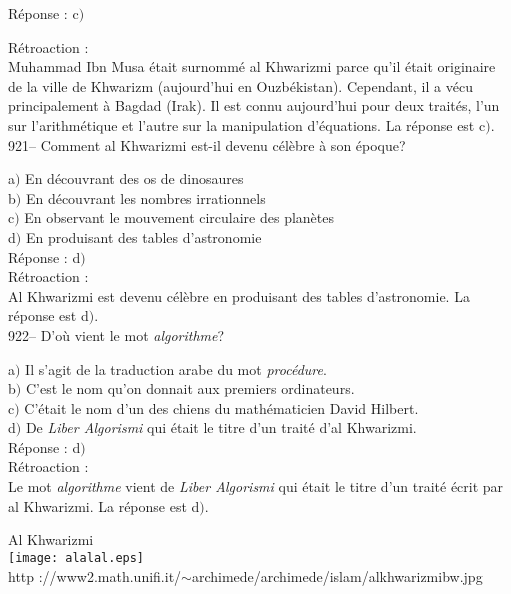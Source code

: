 ﻿\documentclass[letterpaper, 12pt]{article}
\begin{document}
R\'eponse : c$)$\

R\'etroaction : \\
Muhammad Ibn Musa \'etait surnomm\'e al Khwarizmi parce qu'il
\'etait originaire de la ville de Khwarizm (aujourd'hui en
Ouzb\'ekistan). Cependant, il a v\'ecu principalement \`a Bagdad
(Irak). Il est connu aujourd'hui pour deux trait\'es,
l'un sur l'arithm\'etique et l'autre sur la manipulation d'\'equations. La
r\'eponse est c$)$.\\

921-- Comment al Khwarizmi est-il devenu c\'el\`ebre \`a son
\'epoque?

a$)$ En d\'ecouvrant des os de dinosaures \\
b$)$ En d\'ecouvrant les nombres irrationnels \\
c$)$ En observant le mouvement circulaire des plan\`etes \\
d$)$ En produisant des tables d'astronomie \\

R\'eponse : d$)$\\

R\'etroaction : \\
Al Khwarizmi est devenu c\'el\`ebre en produisant des tables d'astronomie.
La r\'eponse est d$)$.\\

922-- D'o\`u vient le mot {\sl algorithme}?

a$)$ Il s'agit de la traduction arabe du mot {\sl proc\'edure}. \\
b$)$ C'est le nom qu'on donnait aux premiers ordinateurs. \\
c$)$ C'\'etait le nom d'un des chiens du math\'ematicien David Hilbert. \\
d$)$ De {\sl Liber Algorismi} qui \'etait le titre d'un trait\'e d'al
Khwarizmi. \\

R\'eponse : d$)$\\

R\'etroaction :\\
Le mot {\sl algorithme} vient de {\sl Liber Algorismi} qui \'etait le titre
d'un trait\'e \'ecrit par al Khwarizmi. La r\'eponse est d$)$.\\

        \begin{center}
        Al Khwarizmi\\
    \texttt{[image: alalal.eps]}\\
        {\footnotesize http
://www2.math.unifi.it/$\sim$archimede/archimede/islam/alkhwarizmibw.jpg}
    \end{center}
\end{document}
